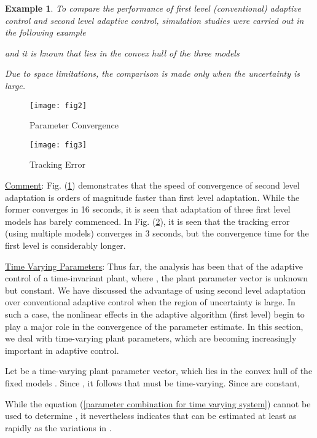 \documentclass[conference]{IEEEtran}
\newtheorem{Example}{Example}
\begin{document}
 \begin{Example}
 To compare the performance of first level (conventional) adaptive control and second level adaptive control, simulation studies were carried out in the following example

and it is known that  lies in the convex hull of the three models

Due to space limitations, the comparison is made only when the uncertainty is large.
 \end{Example}

\begin{figure}[H]
\texttt{[image: fig2]}
\caption{Parameter Convergence}
\label{Fig2}
\end{figure}
\begin{figure}[H]
\texttt{[image: fig3]}
\caption{Tracking Error}
\label{Fig3}
\end{figure}
{\large \underline{Comment}}: Fig. (\ref{Fig2}) demonstrates that the speed of convergence of second level adaptation is orders of magnitude faster than first level adaptation. While the former converges in 16 seconds, it is seen that adaptation of three first level models has barely commenced. In Fig. (\ref{Fig3}), it is seen that the tracking error (using multiple models) converges in 3 seconds, but the convergence time for the first level is considerably longer.



{\large \underline{Time Varying Parameters}}: Thus far, the analysis has been that of the adaptive control of a time-invariant plant, where , the plant parameter vector is unknown but constant. We have discussed the advantage of using second level adaptation over conventional adaptive control when the region of uncertainty is large. In such a case, the  nonlinear effects in the adaptive algorithm (first level) begin to play a major role in the convergence of the parameter estimate. In this section, we deal with time-varying plant parameters, which are becoming increasingly important in adaptive control.

Let  be a time-varying plant parameter vector, which lies in the convex hull of the fixed models . Since , it follows that  must be time-varying. Since  are constant,

While the equation (\ref{parameter combination for time varying system}) cannot be used to determine , it nevertheless indicates that  can be estimated at least as rapidly as the variations  in .
\end{document}
